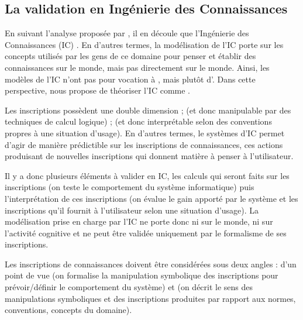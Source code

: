 \subsection{La validation en Ingénierie des Connaissances}\label{sec:valid-ic}
En suivant l'analyse proposée par \cite{Bachimont2004}, il en découle que  l'Ingénierie des Connaissances (IC) . 
En d'autres termes, la modélisation de l'IC porte sur les concepts utilisés par les gens de ce domaine pour penser et établir des connaissances sur le monde, mais pas directement sur le monde.
Ainsi, les modèles de l'IC n'ont pas pour vocation à , mais plutôt d'. 
Dans cette perspective, \citeauthor{Bachimont2004} nous propose de théoriser l'IC comme . 
        
Les inscriptions possèdent une double dimension ;  (et donc manipulable par des techniques de calcul logique) ;  (et donc interprétable selon des conventions propres à une situation d'usage).  
En d'autres termes, le systèmes d'IC permet d'agir de manière prédictible sur les inscriptions de connaissances, ces actions produisant de nouvelles inscriptions qui donnent matière à penser à l'utilisateur. 
        
Il y a donc plusieurs éléments à valider en IC, les calculs qui seront faits sur les inscriptions (on teste le comportement du système informatique) puis l'interprétation de ces inscriptions (on évalue le gain apporté par le système et les inscriptions qu'il fournit à l'utilisateur selon une situation d'usage). 
La modélisation prise en charge par l'IC ne porte donc ni sur le monde, ni sur l'activité cognitive et ne peut être validée uniquement par le formalisme de ses inscriptions. 
        
Les inscriptions de connaissances doivent être considérées sous deux angles : d'un point de vue  (on formalise la manipulation symbolique des inscriptions pour prévoir/définir le comportement du système) et  (on décrit le sens des manipulations symboliques et des inscriptions produites par rapport aux normes, conventions, concepts du domaine).









